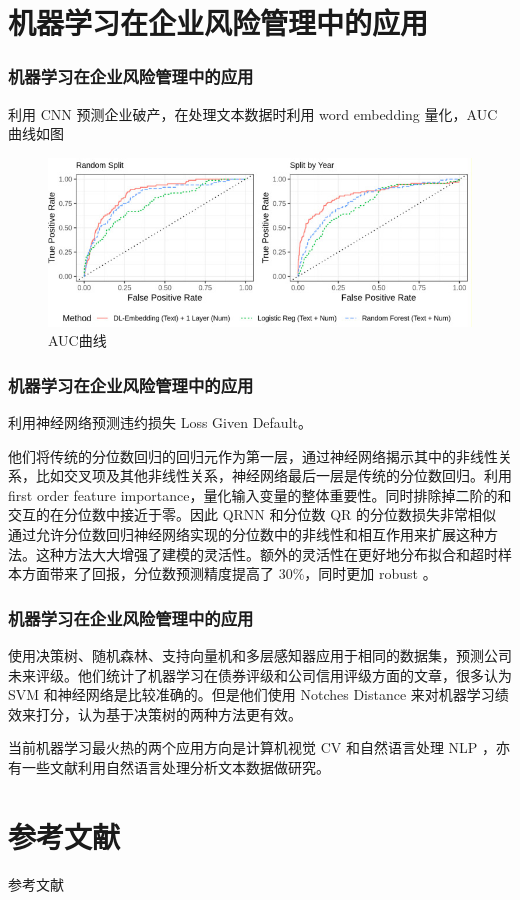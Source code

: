 \documentclass[mathserif,envcountsect,fontset=mac]{ctexbeamer}
\begin{document}
\section{机器学习在企业风险管理中的应用}

\begin{frame}
    \frametitle{机器学习在企业风险管理中的应用}
    \Textcite{mai2019deep} 利用 CNN 预测企业破产，在处理文本数据时利用 word embedding 量化，AUC 曲线如图
    \begin{figure}
        \includegraphics[width=\linewidth]{../lib/mlinerm.jpg}
        \caption{AUC曲线}
    \end{figure}
\end{frame}
\begin{frame}
    \frametitle{机器学习在企业风险管理中的应用}
    \Textcite{kellner2022opening} 利用神经网络预测违约损失 Loss Given Default。

    他们将传统的分位数回归的回归元作为第一层，通过神经网络揭示其中的非线性关系，比如交叉项及其他非线性关系，神经网络最后一层是传统的分位数回归。利用 first order feature importance，量化输入变量的整体重要性。同时排除掉二阶的和交互的在分位数中接近于零。因此 QRNN 和分位数 QR 的分位数损失非常相似
    通过允许分位数回归神经网络实现的分位数中的非线性和相互作用来扩展这种方法。这种方法大大增强了建模的灵活性。额外的灵活性在更好地分布拟合和超时样本方面带来了回报，分位数预测精度提高了 30\%，同时更加 robust 。
\end{frame}
\begin{frame}
    \frametitle{机器学习在企业风险管理中的应用}
    \Textcite{golbayani2020comparative}
    使用决策树、随机森林、支持向量机和多层感知器应用于相同的数据集，预测公司未来评级。他们统计了机器学习在债券评级和公司信用评级方面的文章，很多认为 SVM 和神经网络是比较准确的。但是他们使用 Notches Distance 来对机器学习绩效来打分，认为基于决策树的两种方法更有效。

    当前机器学习最火热的两个应用方向是计算机视觉 CV 和自然语言处理 NLP ，亦有一些文献利用自然语言处理分析文本数据做研究。
\end{frame}
\section{参考文献}
\begin{frame}{参考文献}
    \printbibliography
\end{frame}
\end{document}
